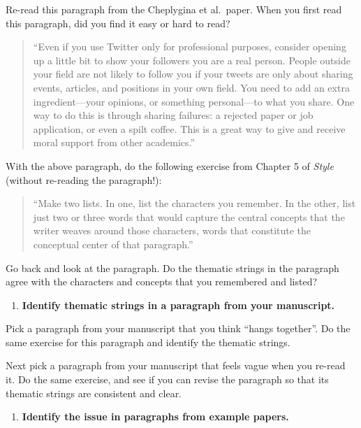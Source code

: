 \documentclass[]{tufte-book}
\providecommand{\tightlist}{%
  \setlength{\itemsep}{0pt}\setlength{\parskip}{0pt}}
\begin{document}
Re-read this paragraph from the Cheplygina et al.~paper. When you first read
this paragraph, did you find it easy or hard to read?

\begin{quote}
``Even if you use Twitter only for professional purposes, consider opening up a
little bit to show your followers you are a real person. People outside your
field are not likely to follow you if your tweets are only about sharing events,
articles, and positions in your own field. You need to add an extra
ingredient---your opinions, or something personal---to what you share. One way to do
this is through sharing failures: a rejected paper or job application, or even a
spilt coffee. This is a great way to give and receive moral support from other
academics.''
\end{quote}

With the above paragraph, do the following exercise from Chapter 5 of \emph{Style}
(without re-reading the paragraph!):

\begin{quote}
``Make two lists. In one, list the characters you remember. In the other, list
just two or three words that would capture the central concepts that the writer
weaves around those characters, words that constitute the conceptual center of
that paragraph.''
\end{quote}

Go back and look at the paragraph. Do the thematic strings in the paragraph
agree with the characters and concepts that you remembered and listed?

\begin{enumerate}
\def\labelenumi{\arabic{enumi}.}
\setcounter{enumi}{2}
\tightlist
\item
  \textbf{Identify thematic strings in a paragraph from your manuscript.}
\end{enumerate}

Pick a paragraph from your manuscript that you think ``hangs together''. Do the same
exercise for this paragraph and identify the thematic strings.

Next pick a paragraph from your manuscript that feels vague when you re-read it.
Do the same exercise, and see if you can revise the paragraph so that its
thematic strings are consistent and clear.

\begin{enumerate}
\def\labelenumi{\arabic{enumi}.}
\setcounter{enumi}{3}
\tightlist
\item
  \textbf{Identify the issue in paragraphs from example papers.}
\end{enumerate}
\end{document}
